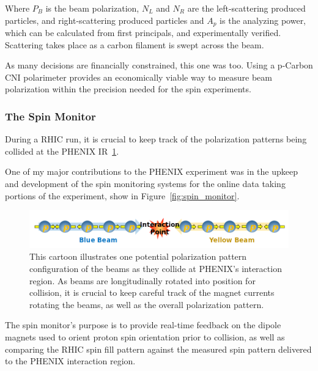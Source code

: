 Where $P_B$ is the beam polarization, $N_L$ and $N_R$ are the left-scattering
produced particles, and right-scattering produced particles and $A_p$ is the
analyzing power, which can be calculated from first principals, and
experimentally verified. Scattering takes place as a carbon filament is swept
across the beam.

As many decisions are financially constrained, this one was too. Using a
p-Carbon CNI polarimeter provides an economically viable way to measure beam
polarization within the precision needed for the spin experiments.

\subsubsection{The Spin Monitor}
\label{sec:the_spin_monitor}

During a RHIC run, it is crucial to keep track of the polarization patterns
being collided at the PHENIX IR~\ref{fig:phenix_spin_collision}. 

One of my major contributions to the PHENIX experiment was in the upkeep and
development of the spin monitoring systems for the online data taking portions
of the experiment, show in Figure~\ref{fig:spin_monitor}.


\begin{figure}
  \centering
  \includegraphics[width=\linewidth]{./figures/phenix_spin_collision}
  \caption{
    This cartoon illustrates one potential polarization pattern configuration
    of the beams as they collide at PHENIX's interaction region.  As beams are
    longitudinally rotated into position for collision, it is crucial to keep
    careful track of the magnet currents rotating the beams, as well as the
    overall polarization pattern.
  }
  \label{fig:phenix_spin_collision}
\end{figure}

The spin monitor's purpose is to provide real-time feedback on the dipole
magnets used to orient proton spin orientation prior to collision, as well as
comparing the RHIC spin fill pattern against the measured spin pattern delivered
to the PHENIX interaction region. 

